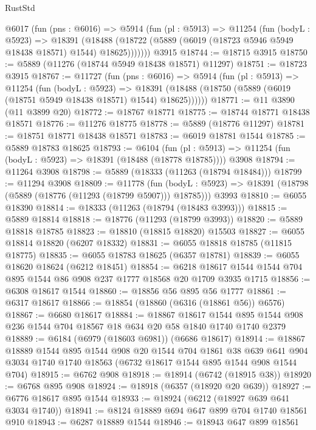 \begin{lexlean}{RustStd}
\begin{coremodule}
    @6017
      (fun (pns : @6016) =>
      @5914
        (fun (pl : @5913) =>
        @11254
          (fun (bodyL : @5923) =>
          @18391
            (@18488 (@18722 (@5889 (@6019 (@18723 @5946 @5949 @18438 @18571) @1544) @18625)))))))
    @3915
@18744 := @18715 @3915
@18750 := @5889 (@11276 (@18744 @5949 @18438 @18571) @11297)
@18751 := @18723 @3915
@18767 := @11727
    (fun (pns : @6016) =>
    @5914
      (fun (pl : @5913) =>
      @11254
        (fun (bodyL : @5923) =>
        @18391 (@18488 (@18750 (@5889 (@6019 (@18751 @5949 @18438 @18571) @1544) @18625))))))
@18771 := @11 @3890 (@11 @3899 @20)
@18772 := @18767 @18771
@18775 := @18744 @18771 @18438 @18571
@18776 := @11276 @18775
@18778 := @5889 (@18776 @11297)
@18781 := @18751 @18771 @18438 @18571
@18783 := @6019 @18781 @1544
@18785 := @5889 @18783 @18625
@18793 := @6104
    (fun (pl : @5913) => @11254 (fun (bodyL : @5923) => @18391 (@18488 (@18778 @18785))))
    @3908
@18794 := @11264 @3908
@18798 := @5889 (@18333 (@11263 (@18794 @18484)))
@18799 := @11294 @3908
@18809 := @11778
    (fun (bodyL : @5923) => @18391 (@18798 (@5889 (@18776 (@11293 (@18799 @5907))) @18785)))
    @3993
@18810 := @6055 @18390
@18814 := @18333 (@11263 (@18794 (@18483 @3993)))
@18815 := @5889 @18814
@18818 := @18776 (@11293 (@18799 @3993))
@18820 := @5889 @18818 @18785
@18823 := @18810 (@18815 @18820) @15503
@18827 := @6055 @18814 @18820 (@6207 @18332)
@18831 := @6055 @18818 @18785 (@11815 @18775)
@18835 := @6055 @18783 @18625 (@6357 @18781)
@18839 := @6055 @18620 @18624 (@6212 @18451)
@18854 := @6218 @18617 @1544 @1544 @704 @895 @1544 @86 @908 @237 @1777 @18568 @20 @1709 @3935 @1715
@18856 := @6308 @18617 @1544
@18860 := @18856 @56 @895 @56 @1777
@18861 := @6317 @18617
@18866 := @18854 (@18860 (@6316 (@18861 @56)) @6576)
@18867 := @6680 @18617
@18884 := @18867
    @18617
    @1544
    @895
    @1544
    @908
    @236
    @1544
    @704
    @18567
    @18
    @634
    @20
    @58
    @1840
    @1740
    @1740
    @2379
@18889 := @6184 (@6979 (@18603 @6981)) (@6686 @18617)
@18914 := @18867
    @18889
    @1544
    @895
    @1544
    @908
    @20
    @1544
    @704
    @1861
    @38
    @639
    @641
    @904
    @3034
    @1740
    @1740
    @18563
    (@6732 @18617 @1544 @895 @1544 @908 @1544 @704)
@18915 := @6762 @908
@18918 := @18914 (@6742 (@18915 @38))
@18920 := @6768 @895 @908
@18924 := @18918 (@6357 (@18920 @20 @639))
@18927 := @6776 @18617 @895 @1544
@18933 := @18924 (@6212 (@18927 @639 @641 @3034 @1740))
@18941 := @8124 @18889 @694 @647 @899 @704 @1740 @18561 @910
@18943 := @6287 @18889 @1544
@18946 := @18943 @647 @899 @18561

\end{coremodule}
\end{lexlean}
